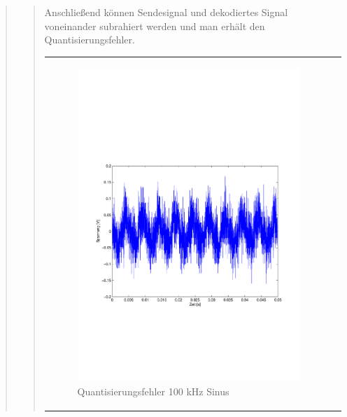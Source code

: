\begin{quote}
\begin{quote}
        
        
        Anschließend können Sendesignal und dekodiertes Signal voneinander subrahiert werden und man erhält den
        Quantisierungsfehler.\\
        
        \begin{center}
            \begin{tabular}{ll}
            
            \hspace{-4cm}
                \begin{minipage}{0.6\textwidth}
                    \begin{figure}[H]
                        \includegraphics[scale=0.5, trim = 16mm 70mm 16mm 85mm, clip]
                                        {Bilder/100kHz_sin_Quantisierungsfehler}
                          \caption{Quantisierungsfehler 100 kHz Sinus}
                          \label{fig:QuantErr 100 kHz Sinus}
                    \end{figure}
                \end{minipage}
                

\end{tabular}
\end{center}
\end{quote}
\end{quote}
